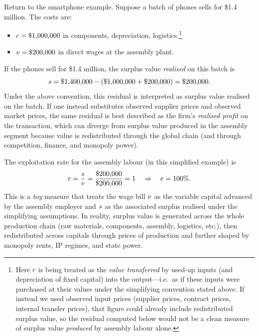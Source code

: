 Return to the smartphone example. Suppose a batch of phones sells for
\$1.4 million. The costs are:

\begin{itemize}[leftmargin=1.5em]
  \item $c = \$1{,}000{,}000$ in components, depreciation, logistics.\footnote{Here $c$ is being treated as the \emph{value transferred} by used-up inputs (and depreciation of fixed capital) into the output---i.e.\ as if these inputs were purchased at their values under the simplifying convention stated above. If instead we used observed input prices (supplier prices, contract prices, internal transfer prices), that figure could already include redistributed surplus value, so the residual computed below would not be a clean measure of surplus value \emph{produced} by assembly labour alone.}
  \item $v = \$200{,}000$ in direct wages at the assembly plant.
\end{itemize}

If the phones sell for \$1.4 million, the surplus value \emph{realised} on this batch is
\begin{equation}
  s = \$1{,}400{,}000 - (\$1{,}000{,}000 + \$200{,}000) = \$200{,}000.
\end{equation}
Under the above convention, this residual is interpreted as surplus value realised on the batch.
If one instead substitutes observed supplier prices and observed market prices, the same residual is best described as
the firm's \emph{realised profit} on the transaction, which can diverge from surplus value produced in the assembly segment
because value is redistributed through the global chain (and through competition, finance, and monopoly power).

The exploitation rate for the assembly labour (in this simplified example) is
\begin{equation}
  e = \frac{s}{v}
  = \frac{\$200{,}000}{\$200{,}000} = 1 \quad\Rightarrow\quad e = 100\%.
\end{equation}
This is a \emph{toy} measure that treats the wage bill $v$ as the variable capital advanced by the assembly employer and
$s$ as the associated surplus realised under the simplifying assumptions. In reality, surplus value is generated across
the whole production chain (raw materials, components, assembly, logistics, etc.), then redistributed across capitals through
prices of production and further shaped by monopoly rents, IP regimes, and state power.

